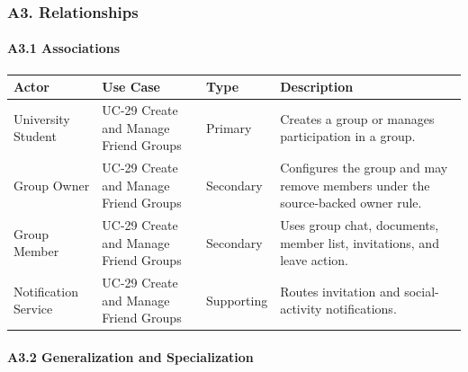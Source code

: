 \documentclass[12pt]{article}
\renewcommand{\baselinestretch}{1.5}
\begin{document}
\hypertarget{sec:a3-relationships}{}
\subsubsection*{A3. Relationships}
\par\medskip

\hypertarget{sec:a3-1-associations}{}
\paragraph*{A3.1 Associations}
\par\medskip

\begingroup
\small
\renewcommand{\baselinestretch}{1.0}\selectfont
\renewcommand{\arraystretch}{1.15}
\setlength{\tabcolsep}{6pt}
\begin{longtable}{|>{\raggedright\arraybackslash}p{}|>{\raggedright\arraybackslash}p{}|>{\raggedright\arraybackslash}p{}|>{\raggedright\arraybackslash}p{}|}
\hline
\textbf{Actor} & \textbf{Use Case} & \textbf{Type} & \textbf{Description} \\ \hline
\endhead
University Student & UC-29 Create and Manage Friend Groups & Primary & Creates a group or manages participation in a group. \\ \hline
Group Owner & UC-29 Create and Manage Friend Groups & Secondary & Configures the group and may remove members under the source-backed owner rule. \\ \hline
Group Member & UC-29 Create and Manage Friend Groups & Secondary & Uses group chat, documents, member list, invitations, and leave action. \\ \hline
Notification Service & UC-29 Create and Manage Friend Groups & Supporting & Routes invitation and social-activity notifications. \\ \hline
\end{longtable}
\endgroup
\par\medskip

\hypertarget{sec:a3-2-generalization-and-specialization}{}
\paragraph*{A3.2 Generalization and Specialization}
\par\medskip
\end{document}

